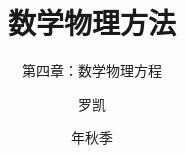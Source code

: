 \documentclass[fontset=fandol,10pt]{ctexbeamer}
\title{数学物理方法}
\subtitle{第四章：数学物理方程}
\author{罗凯}
\institute{南京理工大学物理学院}
\date{\zhdigits{2026}年秋季}
\begin{document}
\chaptertitleframe
\chapteroutline

\end{document}
